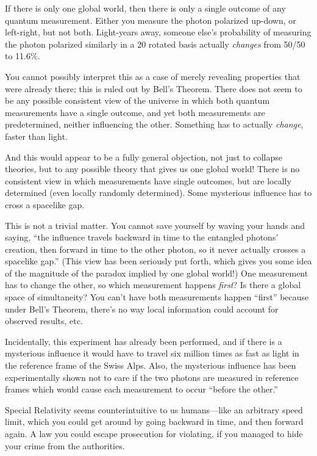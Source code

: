 {
 If there is only one global world, then there is only a single
outcome of any quantum measurement. Either you measure the photon
polarized up-down, or left-right, but not both. Light-years away,
someone else's probability of measuring the photon
polarized similarly in a 20\degree{} rotated basis actually
\textit{changes} from 50/50 to 11.6\%.}

{
 You cannot possibly interpret this as a case of merely revealing
properties that were already there; this is ruled out by
Bell's Theorem. There does not seem to be any possible
consistent view of the universe in which both quantum measurements have
a single outcome, and yet both measurements are predetermined, neither
influencing the other. Something has to actually \textit{change},
faster than light.}

{
 And this would appear to be a fully general objection, not just to
collapse theories, but to any possible theory that gives us one global
world! There is no consistent view in which measurements have single
outcomes, but are locally determined (even locally randomly
determined). Some mysterious influence has to cross a spacelike gap.}

{
 This is not a trivial matter. You cannot save yourself by waving
your hands and saying, ``the influence travels
backward in time to the entangled photons' creation,
then forward in time to the other photon, so it never actually crosses
a spacelike gap.'' (This view has been seriously put
forth, which gives you some idea of the magnitude of the paradox
implied by one global world!) One measurement has to change the other,
so which measurement happens \textit{first}? Is there a global space of
simultaneity? You can't have both measurements happen
``first'' because under
Bell's Theorem, there's no way local
information could account for observed results, etc.}

{
 Incidentally, this experiment has already been performed, and if
there is a mysterious influence it would have to travel six million
times as fast as light in the reference frame of the Swiss Alps. Also,
the mysterious influence has been experimentally shown not to care if
the two photons are measured in reference frames which would cause each
measurement to occur ``before the
other.''}

{
 Special Relativity seems counterintuitive to us humans---like an
arbitrary speed limit, which you could get around by going backward in
time, and then forward again. A law you could escape prosecution for
violating, if you managed to hide your crime from the authorities.}


